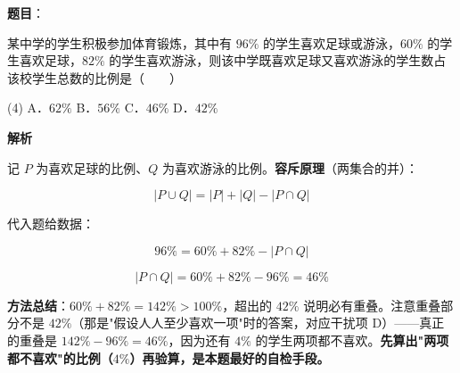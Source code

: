 \begin{answer}

\textbf{题目}：

某中学的学生积极参加体育锻炼，其中有 $96\%$ 的学生喜欢足球或游泳，$60\%$ 的学生喜欢足球，$82\%$ 的学生喜欢游泳，则该中学既喜欢足球又喜欢游泳的学生数占该校学生总数的比例是\mbox{（　　）}

\begin{gkopts}(4)
\task A．$62\%$
\task B．$56\%$
\task C．$46\%$
\task D．$42\%$
\end{gkopts}

\textbf{解析}

记 $P$ 为喜欢足球的比例、$Q$ 为喜欢游泳的比例。\textbf{容斥原理}（两集合的并）：

\nopagebreak[4]
\[|P\cup Q|=|P|+|Q|-|P\cap Q|\]

代入题给数据：

\nopagebreak[4]
\[96\%=60\%+82\%-|P\cap Q|\]

\nopagebreak[4]
\[|P\cap Q|=60\%+82\%-96\%=46\%\]

\begin{gktip}
\textbf{方法总结}：$60\%+82\%=142\%>100\%$，超出的 $42\%$ 说明必有重叠。注意重叠部分不是 $42\%$（那是"假设人人至少喜欢一项"时的答案，对应干扰项 D）——真正的重叠是 $142\%-96\%=46\%$，因为还有 $4\%$ 的学生两项都不喜欢。\textbf{先算出"两项都不喜欢"的比例（$4\%$）再验算，是本题最好的自检手段。}
\end{gktip}


\par\medskip

\end{answer}
